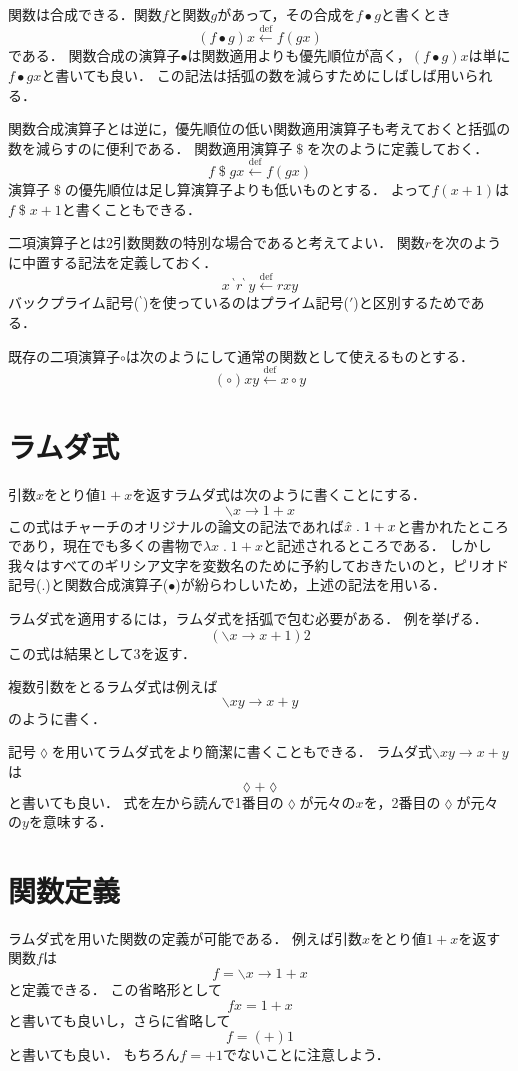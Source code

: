 \documentclass[twocolumn]{jsbook}
\newcommand{\comp}{\bullet} %
\newcommand{\defeq}{\xleftarrow{\text{def}}}
\newcommand{\dollar}{\mathop{\$}} %
\newcommand{\haskelllambda}{\backslash}
\newcommand{\lambdaperiod}{\;.\;}
\begin{document}
関数は合成できる．関数$f$と関数$g$があって，その合成を$f\comp g$と書くとき$$(f\comp g)x\defeq f(gx)$$である．
関数合成の演算子$\comp$は関数適用よりも優先順位が高く，$(f\comp g)x$は単に$f\comp gx$と書いても良い．
この記法は括弧の数を減らすためにしばしば用いられる．

関数合成演算子とは逆に，優先順位の低い関数適用演算子も考えておくと括弧の数を減らすのに便利である．
関数適用演算子$\dollar$を次のように定義しておく．
$$f\dollar gx\defeq f(gx)$$
演算子$\dollar$の優先順位は足し算演算子よりも低いものとする．
よって$f(x+1)$は$f\dollar x+1$と書くこともできる．

二項演算子とは2引数関数の特別な場合であると考えてよい．
関数$r$を次のように中置する記法を定義しておく．
$$x\,{}^\backprime r^\backprime\,y\defeq rxy$$
バックプライム記号(${}^\backprime$)を使っているのはプライム記号($'$)と区別するためである．

既存の二項演算子$\circ$は次のようにして通常の関数として使えるものとする．
$$(\circ)xy\defeq x\circ y$$

\section{ラムダ式}

引数$x$をとり値$1+x$を返すラムダ式は次のように書くことにする．
$$\haskelllambda x\rightarrow 1+x$$
この式はチャーチのオリジナルの論文の記法であれば$\Hat x\lambdaperiod 1+x$と書かれたところであり，現在でも多くの書物で$\lambda x\lambdaperiod 1+x$と記述されるところである．
しかし我々はすべてのギリシア文字を変数名のために予約しておきたいのと，ピリオド記号($.$)と関数合成演算子($\comp$)が紛らわしいため，上述の記法を用いる．

ラムダ式を適用するには，ラムダ式を括弧で包む必要がある．
例を挙げる．
$$\left(\haskelllambda x\rightarrow x+1\right)2$$
この式は結果として$3$を返す．

複数引数をとるラムダ式は例えば$$\haskelllambda xy\rightarrow x+y$$のように書く．

記号$\lozenge$を用いてラムダ式をより簡潔に書くこともできる．
ラムダ式$\haskelllambda xy\rightarrow x+y$は$$\lozenge+\lozenge$$と書いても良い．
式を左から読んで1番目の$\lozenge$が元々の$x$を，2番目の$\lozenge$が元々の$y$を意味する．

\section{関数定義}

ラムダ式を用いた関数の定義が可能である．
例えば引数$x$をとり値$1+x$を返す関数$f$は$$f=\haskelllambda x\rightarrow 1+x$$と定義できる．
この省略形として$$fx=1+x$$と書いても良いし，さらに省略して$$f=(+)1$$と書いても良い．
もちろん$f=+1$でないことに注意しよう．
\end{document}
